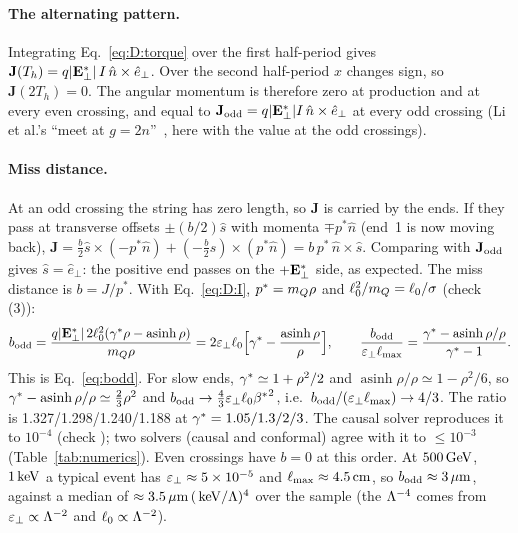 \paragraph{The alternating pattern.} Integrating Eq.~\eqref{eq:D:torque} over the first half-period gives
$\mathbf J(T_h)=q|\mathbf{E}^*_\perp|\,I\,\hat n\times\hat e_\perp$. Over the second half-period $x$ changes sign, so
$\mathbf J(2T_h)=0$. The angular momentum is therefore zero at production and at every even crossing, and equal to
$\mathbf J_{\rm odd}=q|\mathbf{E}^*_\perp|I\,\hat n\times\hat e_\perp$ at every odd crossing (Li et al.'s ``meet at
$g=2n$''~\cite[Eqs.~(A.4)--(A.5)]{Li:2020aoq}, here with the value at the odd crossings).

\paragraph{Miss distance.} At an odd crossing the string has zero length, so $\mathbf J$ is carried by the ends. If they
pass at transverse offsets $\pm(b/2)\hat s$ with momenta $\mp p^*\hat n$ (end~1 is now moving back),
$\mathbf J=\tfrac b2\hat s\times(-p^*\hat n)+(-\tfrac b2\hat s)\times(p^*\hat n)=b\,p^*\,\hat n\times\hat s$. Comparing
with $\mathbf J_{\rm odd}$ gives $\hat s=\hat e_\perp$: the positive end passes on the $+\mathbf{E}^*_\perp$ side, as
expected. The miss distance is $b=J/p^*$. With Eq.~\eqref{eq:D:I}, $p^*=m_Q\rho$ and $\ell_0^2/m_Q=\ell_0/\sigma$
(check  (3)):
\begin{equation}
  b_{\rm odd}=\frac{q|\mathbf{E}^*_\perp|\,2\ell_0^2(\gamma^*\rho-\operatorname{asinh}\rho)}{m_Q\rho}
  =2\varepsilon_\perp\ell_0\Bigl[\gamma^*-\frac{\operatorname{asinh}\rho}{\rho}\Bigr],\qquad
  \frac{b_{\rm odd}}{\varepsilon_\perp\ell_{\max}}=\frac{\gamma^*-\operatorname{asinh}\rho/\rho}{\gamma^*-1}.
  \label{eq:D:bodd}
\end{equation}
This is Eq.~\eqref{eq:bodd}. For slow ends, $\gamma^*\simeq1+\rho^2/2$ and $\operatorname{asinh}\rho/\rho\simeq1-\rho^2/6$,
so $\gamma^*-\operatorname{asinh}\rho/\rho\simeq\tfrac23\rho^2$ and $b_{\rm odd}\to\tfrac43\varepsilon_\perp\ell_0{\beta^*}^2$, i.e.\
$b_{\rm odd}/(\varepsilon_\perp\ell_{\max})\to4/3$. The ratio is 1.327/1.298/1.240/1.188 at $\gamma^*=1.05/1.3/2/3$. The causal solver reproduces it to $10^{-4}$
(check \rep{c03}); two solvers (causal and conformal) agree with it to $\le10^{-3}$ (Table~\ref{tab:numerics}). Even crossings have $b=0$ at this order. At $500\,\mathrm{GeV}$, $1\,\mathrm{keV}$ a
typical event has $\varepsilon_\perp\approx5\times10^{-5}$ and $\ell_{\max}\approx4.5\,\mathrm{cm}$, so $b_{\rm odd}\approx3\,\mu\mathrm{m}$, against a median of
$\approx3.5\,\mu\mathrm{m}\,(\,\mathrm{keV}/\Lambda)^4$ over the sample (the $\Lambda^{-4}$ comes from $\varepsilon_\perp\propto\Lambda^{-2}$ and $\ell_0\propto\Lambda^{-2}$).

